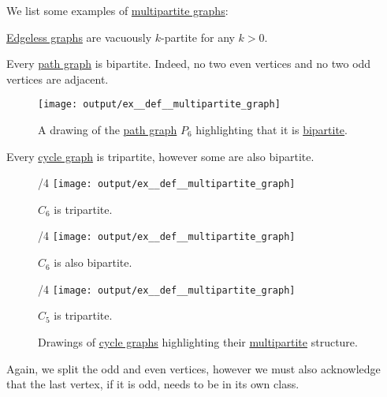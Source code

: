 \begin{example}\label{ex:def:multipartite_graph}
  We list some examples of \hyperref[def:multipartite_graph]{multipartite graphs}:
  \begin{thmenum}
     \hyperref[def:edgeless_graph]{Edgeless graphs} are vacuously \( k \)-partite for any \( k > 0 \).

     Every \hyperref[def:path_graph]{path graph} is bipartite. Indeed, no two even vertices and no two odd vertices are adjacent.
    \begin{figure}[!ht]
      \centering
      \texttt{[image: output/ex\_\_def\_\_multipartite\_graph]}
      \caption{A drawing of the \hyperref[def:path_graph]{path graph} \( P_6 \) highlighting that it is \hyperref[def:multipartite_graph]{bipartite}.}\label{fig:ex:def:multipartite_graph/path}
    \end{figure}

     Every \hyperref[def:cycle_graph]{cycle graph} is tripartite, however some are also bipartite.

    \begin{figure}[!ht]
      \begin{subcaptionblock}{\textwidth/4}
        \centering
        \texttt{[image: output/ex\_\_def\_\_multipartite\_graph]}
        \caption{\( C_6 \) is tripartite.}\label{fig:ex:def:multipartite_graph/cycle/c6_tripartite}
      \end{subcaptionblock}
      \hfill
      \begin{subcaptionblock}{\textwidth/4}
        \centering
        \texttt{[image: output/ex\_\_def\_\_multipartite\_graph]}
        \caption{\( C_6 \) is also bipartite.}\label{fig:ex:def:multipartite_graph/cycle/c6_bipartite}
      \end{subcaptionblock}
      \hfill
      \begin{subcaptionblock}{\textwidth/4}
        \centering
        \texttt{[image: output/ex\_\_def\_\_multipartite\_graph]}
        \caption{\( C_5 \) is tripartite.}\label{fig:ex:def:multipartite_graph/cycle/c5}
      \end{subcaptionblock}
      \caption{Drawings of \hyperref[def:cycle_graph]{cycle graphs} highlighting their \hyperref[def:multipartite_graph]{multipartite} structure.}\label{fig:ex:def:multipartite_graph/cycle}
    \end{figure}

    Again, we split the odd and even vertices, however we must also acknowledge that the last vertex, if it is odd, needs to be in its own class.
  \end{thmenum}
\end{example}

